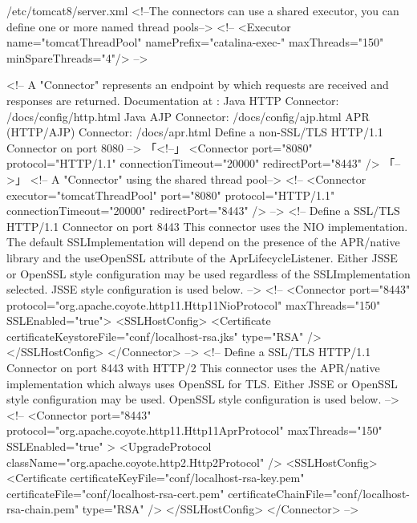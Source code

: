 \documentclass{tarentanleitung}
\begin{document}
\begin{lstdump}[basicstyle=\ttfamily\footnotesize]{/etc/tomcat8/server.xml}
    <!--The connectors can use a shared executor, you can define one or more named thread pools-->
    <!--
    <Executor name="tomcatThreadPool" namePrefix="catalina-exec-"
        maxThreads="150" minSpareThreads="4"/>
    -->

    <!-- A "Connector" represents an endpoint by which requests are received
         and responses are returned. Documentation at :
         Java HTTP Connector: /docs/config/http.html
         Java AJP  Connector: /docs/config/ajp.html
         APR (HTTP/AJP) Connector: /docs/apr.html
         Define a non-SSL/TLS HTTP/1.1 Connector on port 8080
    -->
「<!--」
    <Connector port="8080" protocol="HTTP/1.1"
               connectionTimeout="20000"
               redirectPort="8443" />
「-->」
    <!-- A "Connector" using the shared thread pool-->
    <!--
    <Connector executor="tomcatThreadPool"
               port="8080" protocol="HTTP/1.1"
               connectionTimeout="20000"
               redirectPort="8443" />
    -->
    <!-- Define a SSL/TLS HTTP/1.1 Connector on port 8443
         This connector uses the NIO implementation. The default
         SSLImplementation will depend on the presence of the APR/native
         library and the useOpenSSL attribute of the
         AprLifecycleListener.
         Either JSSE or OpenSSL style configuration may be used regardless of
         the SSLImplementation selected. JSSE style configuration is used below.
    -->
    <!--
    <Connector port="8443" protocol="org.apache.coyote.http11.Http11NioProtocol"
               maxThreads="150" SSLEnabled="true">
        <SSLHostConfig>
            <Certificate certificateKeystoreFile="conf/localhost-rsa.jks"
                         type="RSA" />
        </SSLHostConfig>
    </Connector>
    -->
    <!-- Define a SSL/TLS HTTP/1.1 Connector on port 8443 with HTTP/2
         This connector uses the APR/native implementation which always uses
         OpenSSL for TLS.
         Either JSSE or OpenSSL style configuration may be used. OpenSSL style
         configuration is used below.
    -->
    <!--
    <Connector port="8443" protocol="org.apache.coyote.http11.Http11AprProtocol"
               maxThreads="150" SSLEnabled="true" >
        <UpgradeProtocol className="org.apache.coyote.http2.Http2Protocol" />
        <SSLHostConfig>
            <Certificate certificateKeyFile="conf/localhost-rsa-key.pem"
                         certificateFile="conf/localhost-rsa-cert.pem"
                         certificateChainFile="conf/localhost-rsa-chain.pem"
                         type="RSA" />
        </SSLHostConfig>
    </Connector>
    -->


\end{lstdump}
\end{document}
